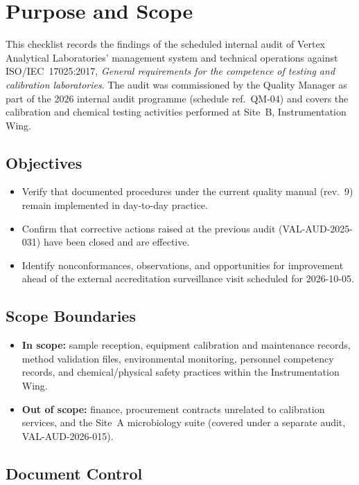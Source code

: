\section{Purpose and Scope}

This checklist records the findings of the scheduled internal audit of Vertex Analytical
Laboratories' management system and technical operations against ISO/IEC~17025:2017,
\emph{General requirements for the competence of testing and calibration laboratories}. The
audit was commissioned by the Quality Manager as part of the 2026 internal audit programme
(schedule ref.\ QM-04) and covers the calibration and chemical testing activities performed
at Site~B, Instrumentation Wing.

\subsection{Objectives}
\begin{itemize}
  \item Verify that documented procedures under the current quality manual (rev.\ 9) remain
        implemented in day-to-day practice.
  \item Confirm that corrective actions raised at the previous audit (VAL-AUD-2025-031) have
        been closed and are effective.
  \item Identify nonconformances, observations, and opportunities for improvement ahead of
        the external accreditation surveillance visit scheduled for 2026-10-05.
\end{itemize}

\subsection{Scope Boundaries}
\begin{itemize}
  \item \textbf{In scope:} sample reception, equipment calibration and maintenance records,
        method validation files, environmental monitoring, personnel competency records, and
        chemical/physical safety practices within the Instrumentation Wing.
  \item \textbf{Out of scope:} finance, procurement contracts unrelated to calibration
        services, and the Site~A microbiology suite (covered under a separate audit,
        VAL-AUD-2026-015).
\end{itemize}

\subsection{Document Control}
\begin{center}
\end{center}
